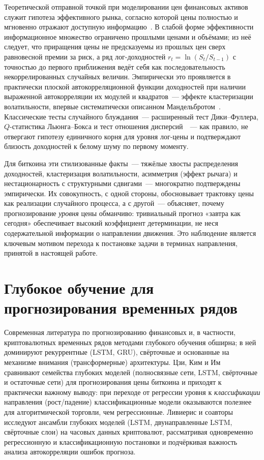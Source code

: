 \documentclass[12pt,a4paper]{report}
\begin{document}
Теоретической отправной точкой при моделировании цен финансовых активов служит
гипотеза эффективного рынка, согласно которой цены полностью и мгновенно отражают
доступную информацию~\cite{fama1970}. В слабой форме эффективности информационное
множество ограничено прошлыми ценами и объёмами; из неё следует, что приращения
цены не предсказуемы из прошлых цен сверх равновесной премии за риск, а ряд
лог-доходностей $r_t=\ln(S_t/S_{t-1})$ с точностью до первого приближения ведёт
себя как последовательность некоррелированных случайных величин. Эмпирически это
проявляется в практически плоской автокорреляционной функции доходностей при
наличии выраженной автокорреляции их модулей и квадратов~--- эффекте кластеризации
волатильности, впервые систематически описанном Мандельбротом~\cite{mandelbrot1963}.
Классические тесты случайного блуждания~--- расширенный тест Дики--Фуллера,
$Q$-статистика Льюнга--Бокса и тест отношения дисперсий~\cite{lo1988}~--- как
правило, не отвергают гипотезу единичного корня для уровня лог-цены и
подтверждают близость доходностей к белому шуму по первому моменту.

Для биткоина эти стилизованные факты~--- тяжёлые хвосты распределения доходностей,
кластеризация волатильности, асимметрия (эффект рычага) и нестационарность с
структурными сдвигами~--- многократно подтверждены эмпирически. Их совокупность,
с одной стороны, обосновывает трактовку цены как реализации случайного процесса, а
с другой~--- объясняет, почему прогнозирование \emph{уровня} цены обманчиво:
тривиальный прогноз «завтра как сегодня» обеспечивает высокий коэффициент
детерминации, не неся содержательной информации о направлении движения. Это
наблюдение является ключевым мотивом перехода к постановке задачи в терминах
направления, принятой в настоящей работе.

\section{Глубокое обучение для прогнозирования временных рядов}

Современная литература по прогнозированию финансовых и, в частности, криптовалютных
временных рядов методами глубокого обучения обширна; в ней доминируют рекуррентные
(LSTM, GRU), свёрточные и основанные на механизме внимания (трансформерные)
архитектуры. Цзи, Ким и Им~\cite{ji2019} сравнивают
семейства глубоких моделей (полносвязные сети, LSTM, свёрточные и остаточные сети)
для прогнозирования цены биткоина и приходят к практически важному выводу: при
переходе от регрессии уровня к \emph{классификации} направления (рост/падение)
классификационные модели оказываются полезнее для алгоритмической торговли, чем
регрессионные. Ливиерис и соавторы~\cite{livieris2020} исследуют ансамбли глубоких
моделей (LSTM, двунаправленные LSTM, свёрточные слои) на часовых данных
криптовалют, рассматривая одновременно регрессионную и классификационную
постановки и подчёркивая важность анализа автокорреляции ошибок прогноза.
\end{document}
